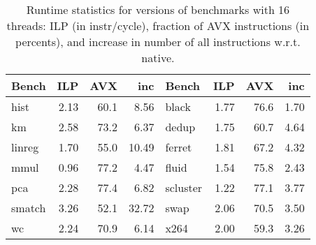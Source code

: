 

\begin{table}
\footnotesize
\centering

\begin{tabular}{l | r r r || l | r r r}
\bfseries Bench & \bfseries ILP & \bfseries AVX & \bfseries inc & \bfseries Bench & \bfseries ILP & \bfseries AVX & \bfseries inc \\
\hline                    
\hline
hist      & 2.13  & 60.1  &  8.56 & black    & 1.77 & 76.6 & 1.70 \\
km        & 2.58  & 73.2  &  6.37 & dedup    & 1.75 & 60.7 & 4.64 \\
linreg    & 1.70  & 55.0  & 10.49 & ferret   & 1.81 & 67.2 & 4.32 \\
mmul      & 0.96  & 77.2  &  4.47 & fluid    & 1.54 & 75.8 & 2.43 \\
pca       & 2.28  & 77.4  &  6.82 & scluster & 1.22 & 77.1 & 3.77 \\
smatch    & 3.26  & 52.1  & 32.72 & swap     & 2.06 & 70.5 & 3.50 \\
wc        & 2.24  & 70.9  &  6.14 & x264     & 2.00 & 59.3 & 3.26 \\
\hline
\end{tabular}


\caption{Runtime statistics for versions of benchmarks with 16 threads: ILP (in instr/cycle), fraction of AVX instructions (in percents), and increase in number of all instructions w.r.t. native.}\label{tab:avxbenches-stats}
\end{table}
